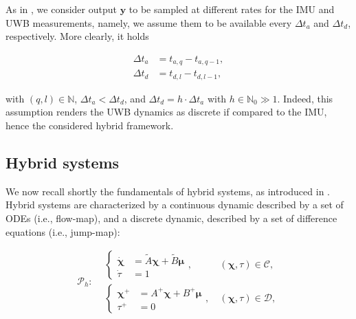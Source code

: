 \medskip
As in \cite{Oliva03}, we consider output $\bm{y}$ to be sampled at different rates for the IMU and UWB measurements, namely, we assume them to be available every $\Delta t_a$ and $\Delta t_d$, respectively. More clearly, it holds

\begin{subequations}
	\begin{align}
		\label{probstat:eqn:deltatimes}
		\Delta t_a & = t_{a,q} - t_{a,q-1}, \\
		\Delta t_d & = t_{d,l} - t_{d,l-1},
	\end{align}
\end{subequations}

\medskip
with $(q,l)\in\mathbb{N}$, $\Delta t_a < \Delta t_d$, and $\Delta t_d = h\cdot\Delta t_a$ with $h\in\mathbb{N}_0\gg 1$. Indeed, this assumption renders the UWB dynamics as discrete if compared to the IMU, hence the considered hybrid framework.

\subsection{Hybrid systems}
\label{probstat:hybsys}

We now recall shortly the fundamentals of hybrid systems, as introduced in \cite{GOEBEL2009}. Hybrid systems are characterized by a continuous dynamic described by a set of ODEs (i.e., flow-map), and a discrete dynamic, described by a set of difference equations (i.e., jump-map):

\begin{subequations}
	\begin{equation}
		\mathcal{P}_h :
		\begin{aligned}
			  &
			\begin{cases}
				\dot{\bm{\chi}} & = \tilde{A}\bm{\chi} + \tilde{B}\bm{\mu} \\
				\dot{\tau}      & = 1
			\end{cases}
			, & \ (\bm{\chi},\tau)\in\mathcal{C}, \\
			  &
			\begin{cases}
				\bm{\chi}^+ & = A^+\bm{\chi} + B^+\bm{\mu} \\
				\tau^+      & = 0
			\end{cases}
			, & \ (\bm{\chi},\tau)\in\mathcal{D},
		\end{aligned}
	\end{equation}
	\label{probstat:eqn:plant_dyn_hybrid}
\end{subequations}


